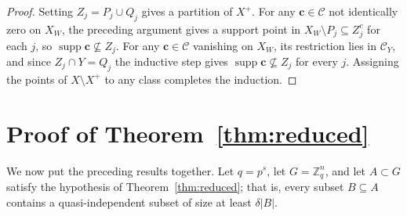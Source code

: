\documentclass[11pt]{amsart}
\newcommand{\Z}{\mathbb{Z}}
\begin{document}
\begin{proof}
Setting $Z_j = P_j \cup Q_j$ gives a partition of $X^+$. For any $\mathbf{c}
\in \mathcal C$ not identically zero on $X_W$, the preceding argument gives a
support point in $X_W \setminus P_j \subseteq Z_j^c$ for each $j$, so
$\operatorname{supp} \mathbf{c} \not\subseteq Z_j$. For any $\mathbf{c} \in
\mathcal C$ vanishing on $X_W$, its restriction lies in $\mathcal C_Y$, and
since $Z_j \cap Y = Q_j$ the inductive step gives $\operatorname{supp}
\mathbf{c} \not\subseteq Z_j$ for every $j$. Assigning the points of $X
\setminus X^+$ to any class completes the induction.
\end{proof}


\section{Proof of Theorem~\ref{thm:reduced}}

We now put the preceding results together. Let \(q=p^s\), let \(G=\Z_q^n\), and let \(A\subset G\) satisfy the hypothesis of Theorem~\ref{thm:reduced}; that is, every subset \(B\subseteq A\) contains a quasi-independent subset of size at least \(\delta |B|\).
\end{document}
